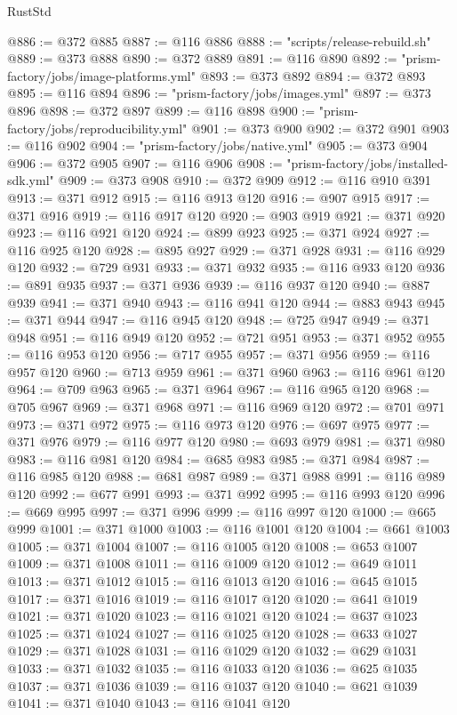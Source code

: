 \begin{lexlean}{RustStd}
\begin{coremodule}
@886 := @372 @885
@887 := @116 @886
@888 := "scripts/release-rebuild.sh"
@889 := @373 @888
@890 := @372 @889
@891 := @116 @890
@892 := "prism-factory/jobs/image-platforms.yml"
@893 := @373 @892
@894 := @372 @893
@895 := @116 @894
@896 := "prism-factory/jobs/images.yml"
@897 := @373 @896
@898 := @372 @897
@899 := @116 @898
@900 := "prism-factory/jobs/reproducibility.yml"
@901 := @373 @900
@902 := @372 @901
@903 := @116 @902
@904 := "prism-factory/jobs/native.yml"
@905 := @373 @904
@906 := @372 @905
@907 := @116 @906
@908 := "prism-factory/jobs/installed-sdk.yml"
@909 := @373 @908
@910 := @372 @909
@912 := @116 @910 @391
@913 := @371 @912
@915 := @116 @913 @120
@916 := @907 @915
@917 := @371 @916
@919 := @116 @917 @120
@920 := @903 @919
@921 := @371 @920
@923 := @116 @921 @120
@924 := @899 @923
@925 := @371 @924
@927 := @116 @925 @120
@928 := @895 @927
@929 := @371 @928
@931 := @116 @929 @120
@932 := @729 @931
@933 := @371 @932
@935 := @116 @933 @120
@936 := @891 @935
@937 := @371 @936
@939 := @116 @937 @120
@940 := @887 @939
@941 := @371 @940
@943 := @116 @941 @120
@944 := @883 @943
@945 := @371 @944
@947 := @116 @945 @120
@948 := @725 @947
@949 := @371 @948
@951 := @116 @949 @120
@952 := @721 @951
@953 := @371 @952
@955 := @116 @953 @120
@956 := @717 @955
@957 := @371 @956
@959 := @116 @957 @120
@960 := @713 @959
@961 := @371 @960
@963 := @116 @961 @120
@964 := @709 @963
@965 := @371 @964
@967 := @116 @965 @120
@968 := @705 @967
@969 := @371 @968
@971 := @116 @969 @120
@972 := @701 @971
@973 := @371 @972
@975 := @116 @973 @120
@976 := @697 @975
@977 := @371 @976
@979 := @116 @977 @120
@980 := @693 @979
@981 := @371 @980
@983 := @116 @981 @120
@984 := @685 @983
@985 := @371 @984
@987 := @116 @985 @120
@988 := @681 @987
@989 := @371 @988
@991 := @116 @989 @120
@992 := @677 @991
@993 := @371 @992
@995 := @116 @993 @120
@996 := @669 @995
@997 := @371 @996
@999 := @116 @997 @120
@1000 := @665 @999
@1001 := @371 @1000
@1003 := @116 @1001 @120
@1004 := @661 @1003
@1005 := @371 @1004
@1007 := @116 @1005 @120
@1008 := @653 @1007
@1009 := @371 @1008
@1011 := @116 @1009 @120
@1012 := @649 @1011
@1013 := @371 @1012
@1015 := @116 @1013 @120
@1016 := @645 @1015
@1017 := @371 @1016
@1019 := @116 @1017 @120
@1020 := @641 @1019
@1021 := @371 @1020
@1023 := @116 @1021 @120
@1024 := @637 @1023
@1025 := @371 @1024
@1027 := @116 @1025 @120
@1028 := @633 @1027
@1029 := @371 @1028
@1031 := @116 @1029 @120
@1032 := @629 @1031
@1033 := @371 @1032
@1035 := @116 @1033 @120
@1036 := @625 @1035
@1037 := @371 @1036
@1039 := @116 @1037 @120
@1040 := @621 @1039
@1041 := @371 @1040
@1043 := @116 @1041 @120

\end{coremodule}
\end{lexlean}
